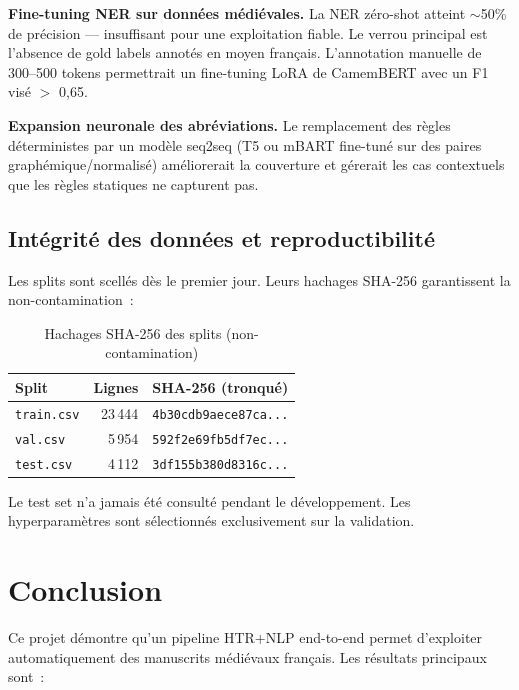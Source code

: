 \documentclass[11pt,a4paper]{article}
\begin{document}
\textbf{Fine-tuning NER sur données médiévales.} La NER zéro-shot atteint $\sim$50\% de précision --- insuffisant pour une exploitation fiable. Le verrou principal est l'absence de gold labels annotés en moyen français. L'annotation manuelle de 300--500 tokens permettrait un fine-tuning LoRA de CamemBERT avec un F1 visé $>$ 0,65.

\textbf{Expansion neuronale des abréviations.} Le remplacement des règles déterministes par un modèle seq2seq (T5 ou mBART fine-tuné sur des paires graphémique/normalisé) améliorerait la couverture et gérerait les cas contextuels que les règles statiques ne capturent pas.

\subsection{Intégrité des données et reproductibilité}

Les splits sont scellés dès le premier jour. Leurs hachages SHA-256 garantissent la non-contamination~:

\begin{table}[H]
\centering
\caption{Hachages SHA-256 des splits (non-contamination)}
\label{tab:sha256}
\begin{tabular}{@{}lrl@{}}
\toprule
\textbf{Split} & \textbf{Lignes} & \textbf{SHA-256 (tronqué)} \\
\midrule
\texttt{train.csv} & 23\,444 & \texttt{4b30cdb9aece87ca...} \\
\texttt{val.csv} & 5\,954 & \texttt{592f2e69fb5df7ec...} \\
\texttt{test.csv} & 4\,112 & \texttt{3df155b380d8316c...} \\
\bottomrule
\end{tabular}
\end{table}

\noindent Le test set n'a jamais été consulté pendant le développement. Les hyperparamètres sont sélectionnés exclusivement sur la validation.

\section{Conclusion}

Ce projet démontre qu'un pipeline HTR+NLP end-to-end permet d'exploiter automatiquement des manuscrits médiévaux français. Les résultats principaux sont~:
\end{document}
